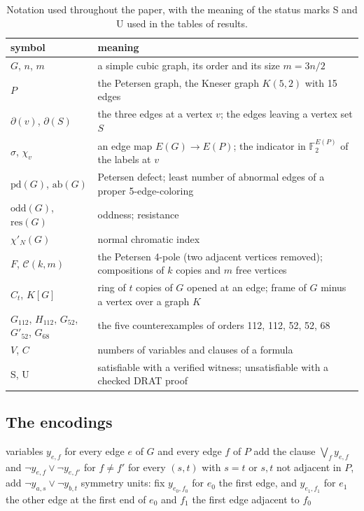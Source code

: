 \documentclass[11pt]{article}
\theoremstyle{definition}
\theoremstyle{remark}
\newcommand{\PG}{P}
\newcommand{\Gmain}{G_{112}}
\newcommand{\Gsym}{H_{112}}
\newcommand{\Gfty}{G_{52}}
\newcommand{\Gftyb}{G'_{52}}
\newcommand{\Gsix}{G_{68}}
\newcommand{\pd}{\mathrm{pd}}
\newcommand{\ab}{\mathrm{ab}}
\begin{document}
\begin{table}[htbp]\centering\footnotesize\setlength{\tabcolsep}{4pt}
\begin{tabular}{>{\raggedright\arraybackslash}p{4.2cm}>{\raggedright\arraybackslash}p{10.3cm}}
\toprule
symbol & meaning\\
\midrule
$G$, $n$, $m$ & a simple cubic graph, its order and its size $m = 3n/2$\\
$\PG$ & the Petersen graph, the Kneser graph $K(5,2)$ with 15 edges\\
$\partial(v)$, $\partial(S)$ & the three edges at a vertex $v$; the edges leaving a vertex set $S$\\
$\sigma$, $\chi_v$ & an edge map $E(G) \to E(\PG)$; the indicator in $\mathbb F_2^{E(\PG)}$ of the labels at $v$\\
$\pd(G)$, $\ab(G)$ & Petersen defect; least number of abnormal edges of a proper 5-edge-coloring\\
$\mathrm{odd}(G)$, $\mathrm{res}(G)$ & oddness; resistance\\
$\chi'_N(G)$ & normal chromatic index\\
$F$, $\mathcal C(k,m)$ & the Petersen 4-pole (two adjacent vertices removed); compositions of $k$ copies and $m$ free vertices\\
$C_t$, $K[G]$ & ring of $t$ copies of $G$ opened at an edge; frame of $G$ minus a vertex over a graph $K$\\
$\Gmain$, $\Gsym$, $\Gfty$, $\Gftyb$, $\Gsix$ & the five counterexamples of orders 112, 112, 52, 52, 68\\
$V$, $C$ & numbers of variables and clauses of a formula\\
S, U & satisfiable with a verified witness; unsatisfiable with a checked DRAT proof\\
\bottomrule
\end{tabular}
\caption{Notation used throughout the paper, with the meaning of the status marks S and U used in the tables of results.}\label{tab:notation}
\end{table}

\subsection{The encodings}

\begin{algorithm}[htbp]
\caption{Petersen edge-image encoding (computations EXP-001, EXP-004, EXP-006)}\label{alg:petersen}
\begin{algorithmic}[1]
\State variables $y_{e,f}$ for every edge $e$ of $G$ and every edge $f$ of $\PG$
 \State add the clause $\bigvee_f y_{e,f}$ and $\lnot y_{e,f} \lor \lnot y_{e,f'}$ for $f \ne f'$ \EndFor
{}
 \State for every $(s,t)$ with $s = t$ or $s,t$ not adjacent in $\PG$, add $\lnot y_{a,s} \lor \lnot y_{b,t}$
\EndFor
\State symmetry units: fix $y_{e_0,f_0}$ for $e_0$ the first edge, and $y_{e_1,f_1}$ for $e_1$ the other
edge at the first end of $e_0$ and $f_1$ the first edge adjacent to $f_0$
\end{algorithmic}
\end{algorithm}
\end{document}

